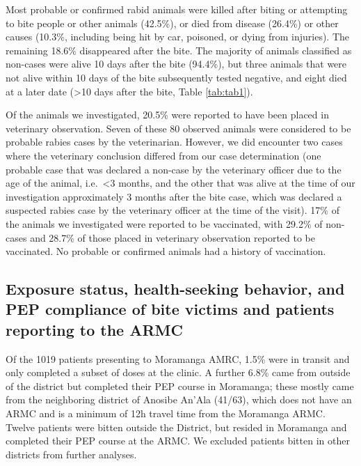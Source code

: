 \documentclass[
  oneside]{book}
\begin{document}
Most probable or confirmed rabid animals were killed after biting or attempting to bite people or other animals (42.5\%), or died from disease (26.4\%) or other causes (10.3\%, including being hit by car, poisoned, or dying from injuries). The remaining 18.6\% disappeared after the bite. The majority of animals classified as non-cases were alive 10 days after the bite (94.4\%), but three animals that were not alive within 10 days of the bite subsequently tested negative, and eight died at a later date (\textgreater10 days after the bite, Table \ref{tab:tab1}).

Of the animals we investigated, 20.5\% were reported to have been placed in veterinary observation. Seven of these 80 observed animals were considered to be probable rabies cases by the veterinarian. However, we did encounter two cases where the veterinary conclusion differed from our case determination (one probable case that was declared a non-case by the veterinary officer due to the age of the animal, i.e.~\textless3 months, and the other that was alive at the time of our investigation approximately 3 months after the bite case, which was declared a suspected rabies case by the veterinary officer at the time of the visit). 17\% of the animals we investigated were reported to be vaccinated, with 29.2\% of non-cases and 28.7\% of those placed in veterinary observation reported to be vaccinated. No probable or confirmed animals had a history of vaccination.

\hypertarget{exposure-status-health-seeking-behavior-and-pep-compliance-of-bite-victims-and-patients-reporting-to-the-armc}{%
\subsection{Exposure status, health-seeking behavior, and PEP compliance of bite victims and patients reporting to the ARMC}\label{exposure-status-health-seeking-behavior-and-pep-compliance-of-bite-victims-and-patients-reporting-to-the-armc}}

Of the 1019 patients presenting to Moramanga AMRC, 1.5\% were in transit and only completed a subset of doses at the clinic. A further 6.8\% came from outside of the district but completed their PEP course in Moramanga; these mostly came from the neighboring district of Anosibe An'Ala (41/63), which does not have an ARMC and is a minimum of 12h travel time from the Moramanga ARMC. Twelve patients were bitten outside the District, but resided in Moramanga and completed their PEP course at the ARMC. We excluded patients bitten in other districts from further analyses.
\end{document}
